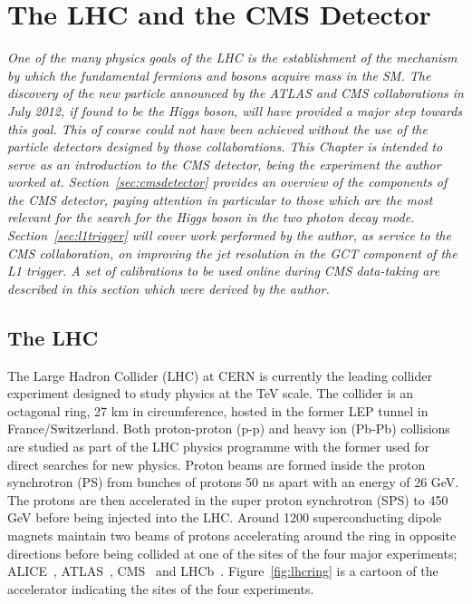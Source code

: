 \chapter{The LHC and the CMS Detector}
\label{chap:detector}

\emph{One of the many physics goals of the LHC is the establishment of the mechanism by which 
the fundamental fermions and bosons acquire mass in the SM. The discovery of the new particle 
announced by the ATLAS and CMS collaborations in July 2012, if found to be the Higgs boson, will have provided 
a major step towards this goal. This of course could not have been achieved without the use
of the particle detectors designed by those collaborations. This Chapter is intended to serve as an 
introduction to the CMS detector, being the experiment the author worked at. Section~\ref{sec:cmsdetector}
provides an overview of the components of the CMS detector, paying attention in particular to those 
which are the most relevant for the search for the Higgs boson in the two photon decay mode. 
Section~\ref{sec:l1trigger} will cover work performed by the author, as service to the CMS collaboration, 
on improving the jet resolution in the GCT component of the L1 trigger. A set of calibrations
to be used online during CMS data-taking are described in this section which were derived by 
the author.}

\section{The LHC}
The Large Hadron Collider (LHC) at CERN is currently the leading collider experiment designed 
to study physics at the TeV scale. The collider is an octagonal 
ring, 27 km in circumference, hosted in the former LEP tunnel in France/Switzerland.  
Both proton-proton (p-p) and heavy ion (Pb-Pb) collisions are
studied as part of the LHC physics programme with the former used 
for direct searches for new physics. Proton beams are formed inside the proton synchrotron (PS)
from bunches of protons 50 ns apart with an energy of 26 GeV. The protons are then accelerated in the 
super proton synchrotron (SPS) to 450 GeV before being injected into the LHC. 
Around 1200 superconducting dipole magnets maintain two beams of protons accelerating around 
the ring in opposite directions before being collided at one of the sites of the four major experiments;
ALICE~\citep{aliceexperiment}, ATLAS~\citep{atlasexperiment}, CMS~\citep{cmsexperiment}
and LHCb~\citep{lhcbexperiment}. Figure~\ref{fig:lhcring} is a cartoon of the accelerator 
indicating the sites of the four experiments.

